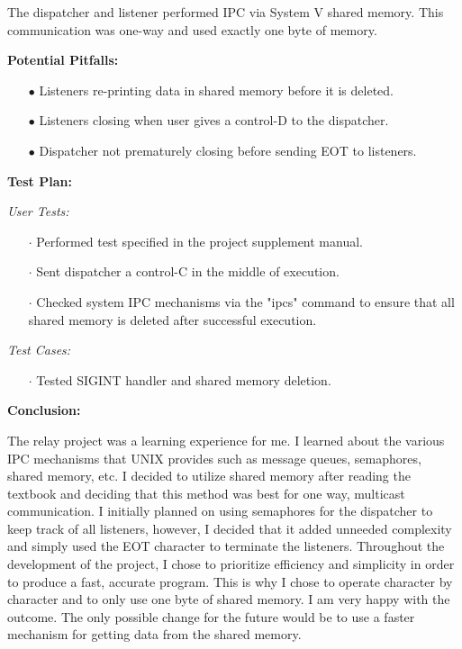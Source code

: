 \documentclass{article}
\begin{document}
The dispatcher and listener performed IPC via System V shared memory. This 
communication was one-way and used exactly one byte of memory.  
\vspace{.5pc}

\begin{flushleft}
\textbf{Potential Pitfalls:}
\vspace{.5pc}
\end{flushleft}

\begin{itemize}
	\item[$\bullet$] Listeners re-printing data in shared memory before it is 
	deleted.
	\item[$\bullet$] Listeners closing when user gives a control-D to the 
	dispatcher.
	\item[$\bullet$] Dispatcher not prematurely closing before sending EOT to
	listeners. 
\end{itemize}
\vspace{.5pc}

\begin{flushleft}
\textbf{Test Plan:}
\vspace{.5pc}
\end{flushleft}

\textit{User Tests:}
\begin{itemize}
	\item[$\cdot$] Performed test specified in the project supplement manual.
	\item[$\cdot$] Sent dispatcher a control-C in the middle of execution.
	\item[$\cdot$] Checked system IPC mechanisms via the "ipcs" command to 
	ensure that all shared memory is deleted after successful execution.
\end{itemize}

\textit{Test Cases:}
\begin{itemize}
	\item[$\cdot$] Tested SIGINT handler and shared memory deletion.
	\end{itemize}
\vspace{.5pc}

\begin{flushleft}
\textbf{Conclusion:}
\vspace{.5pc}
\end{flushleft}

The relay project was a learning experience for me. I learned about the
various IPC mechanisms that UNIX provides such as message queues, semaphores,
shared memory, etc. I decided to utilize shared memory after reading the 
textbook and deciding that this method was best for one way, multicast 
communication. I initially planned on using semaphores for the dispatcher to 
keep track of all listeners, however, I decided that it added unneeded 
complexity and simply used the EOT character to terminate the listeners. 
Throughout the development of the project, I chose to prioritize efficiency
and simplicity in order to produce a fast, accurate program. This is why I 
chose to operate character by character and to only use one byte of shared
memory. I am very happy with the outcome. The only possible change for the 
future would be to use a faster mechanism for getting data from the shared 
memory. 
\end{document}
